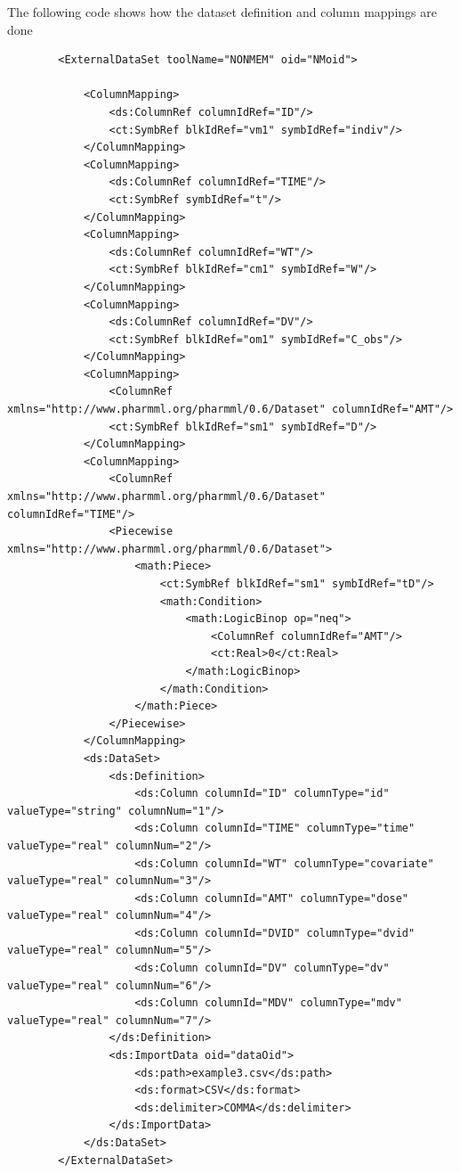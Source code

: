 The following code shows how the dataset definition and column mappings 
are done
\lstset{language=XML}
\begin{lstlisting}
        <ExternalDataSet toolName="NONMEM" oid="NMoid">
            
            <ColumnMapping>
                <ds:ColumnRef columnIdRef="ID"/>
                <ct:SymbRef blkIdRef="vm1" symbIdRef="indiv"/>
            </ColumnMapping>
            <ColumnMapping>
                <ds:ColumnRef columnIdRef="TIME"/>
                <ct:SymbRef symbIdRef="t"/>
            </ColumnMapping>
            <ColumnMapping>
                <ds:ColumnRef columnIdRef="WT"/>
                <ct:SymbRef blkIdRef="cm1" symbIdRef="W"/>
            </ColumnMapping>
            <ColumnMapping>
                <ds:ColumnRef columnIdRef="DV"/>
                <ct:SymbRef blkIdRef="om1" symbIdRef="C_obs"/>
            </ColumnMapping>
            <ColumnMapping>
                <ColumnRef xmlns="http://www.pharmml.org/pharmml/0.6/Dataset" columnIdRef="AMT"/>
                <ct:SymbRef blkIdRef="sm1" symbIdRef="D"/>
            </ColumnMapping>
            <ColumnMapping>
                <ColumnRef xmlns="http://www.pharmml.org/pharmml/0.6/Dataset" columnIdRef="TIME"/>
                <Piecewise xmlns="http://www.pharmml.org/pharmml/0.6/Dataset">
                    <math:Piece>
                        <ct:SymbRef blkIdRef="sm1" symbIdRef="tD"/>
                        <math:Condition>
                            <math:LogicBinop op="neq">
                                <ColumnRef columnIdRef="AMT"/>
                                <ct:Real>0</ct:Real>
                            </math:LogicBinop>
                        </math:Condition>
                    </math:Piece>
                </Piecewise>
            </ColumnMapping>
            <ds:DataSet>
                <ds:Definition>
                    <ds:Column columnId="ID" columnType="id" valueType="string" columnNum="1"/>
                    <ds:Column columnId="TIME" columnType="time" valueType="real" columnNum="2"/>
                    <ds:Column columnId="WT" columnType="covariate" valueType="real" columnNum="3"/>
                    <ds:Column columnId="AMT" columnType="dose" valueType="real" columnNum="4"/>
                    <ds:Column columnId="DVID" columnType="dvid" valueType="real" columnNum="5"/>
                    <ds:Column columnId="DV" columnType="dv" valueType="real" columnNum="6"/>
                    <ds:Column columnId="MDV" columnType="mdv" valueType="real" columnNum="7"/>
                </ds:Definition>
                <ds:ImportData oid="dataOid">
                    <ds:path>example3.csv</ds:path>
                    <ds:format>CSV</ds:format>
                    <ds:delimiter>COMMA</ds:delimiter>
                </ds:ImportData>
            </ds:DataSet>
        </ExternalDataSet>
\end{lstlisting}

